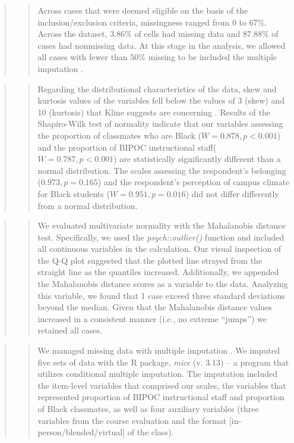 \documentclass[
  11pt,
]{book}
\begin{document}
\begin{quote}
\begin{quote}
Across cases that were deemed eligible on the basis of the inclusion/exclusion criteria, missingness ranged from 0 to 67\%. Across the dataset, 3.86\% of cells had missing data and 87.88\% of cases had nonmissing data. At this stage in the analysis, we allowed all cases with fewer than 50\% missing to be included the multiple imputation \citep{katitas_getting_2019}.
\end{quote}
\end{quote}

\begin{quote}
\begin{quote}
Regarding the distributional characteristics of the data, skew and kurtosis values of the variables fell below the values of 3 (skew) and 10 (kurtosis) that Kline suggests are concerning \citeyearpar{kline_principles_2016}. Results of the Shapiro-Wilk test of normality indicate that our variables assessing the proportion of classmates who are Black (\(W = 0.878, p < 0.001\)) and the proportion of BIPOC instructional staff(\(W = 0.787, p < 0.001\)) are statistically significantly different than a normal distribution. The scales assessing the respondent's belonging (\(0.973, p = 0.165\)) and the respondent's perception of campus climate for Black students (\(W = 0.951, p = 0.016\)) did not differ differently from a normal distribution.
\end{quote}
\end{quote}

\begin{quote}
\begin{quote}
We evaluated multivariate normality with the Mahalanobis distance test. Specifically, we used the \emph{psych::outlier()} function and included all continuous variables in the calculation. Our visual inspection of the Q-Q plot suggested that the plotted line strayed from the straight line as the quantiles increased. Additionally, we appended the Mahalanobis distance scores as a variable to the data. Analyzing this variable, we found that 1 case exceed three standard deviations beyond the median. Given that the Mahalanobis distance values increased in a consistent manner (i.e., no extreme ``jumps'') we retained all cases.
\end{quote}
\end{quote}

\begin{quote}
\begin{quote}
We managed missing data with multiple imputation \citep{enders_multiple_2017, katitas_getting_2019}. We imputed five sets of data with the R package, \emph{mice} (v. 3.13) -- a program that utilizes conditional multiple imputation. The imputation included the item-level variables that comprised our scales, the variables that represented proportion of BIPOC instructional staff and proportion of Black classmates, as well as four auxiliary variables (three variables from the course evaluation and the format {[}in-person/blended/virtual{]} of the class).
\end{quote}
\end{quote}
\end{document}

